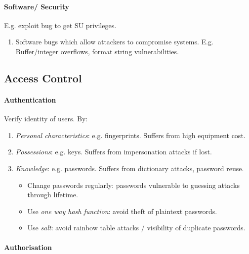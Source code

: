 \documentclass[twocolumn,english]{article}
\begin{document}
\paragraph{Software/ Security}

E.g. exploit bug to get SU privileges.
\begin{enumerate}
\item Software bugs which allow attackers to compromise systems. E.g. Buffer/integer
overflows, format string vulnerabilities.
\end{enumerate}

\subsection{Access Control}

\paragraph{Authentication}

Verify identity of users. By:
\begin{enumerate}
\item \emph{Personal characteristics}: e.g. fingerprints. Suffers from high
equipment cost.
\item \emph{Possessions}: e.g. keys. Suffers from impersonation attacks
if lost.
\item \emph{Knowledge}: e.g. passwords. Suffers from dictionary attacks,
password reuse.
\begin{itemize}
\item Change passwords regularly: passwords vulnerable to guessing attacks
through lifetime.
\item Use \emph{one way hash function}: avoid theft of plaintext passwords.
\item Use \emph{salt}: avoid rainbow table attacks / visibility of duplicate
passwords.
\end{itemize}
\end{enumerate}

\paragraph{Authorisation}
\end{document}
